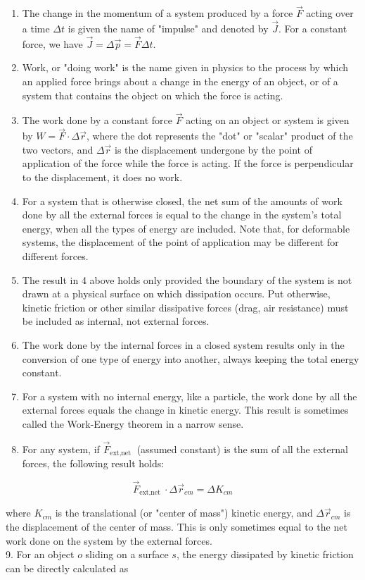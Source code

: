 \documentclass[10pt]{article}
\begin{document}
\begin{enumerate}
  \item The change in the momentum of a system produced by a force $\vec{F}$ acting over a time $\Delta t$ is given the name of "impulse" and denoted by $\vec{J}$. For a constant force, we have $\vec{J}=\Delta \vec{p}=\vec{F} \Delta t$.
  \item Work, or "doing work" is the name given in physics to the process by which an applied force brings about a change in the energy of an object, or of a system that contains the object on which the force is acting.
  \item The work done by a constant force $\vec{F}$ acting on an object or system is given by $W=\vec{F} \cdot \Delta \vec{r}$, where the dot represents the "dot" or "scalar" product of the two vectors, and $\Delta \vec{r}$ is the displacement undergone by the point of application of the force while the force is acting. If the force is perpendicular to the displacement, it does no work.
  \item For a system that is otherwise closed, the net sum of the amounts of work done by all the external forces is equal to the change in the system's total energy, when all the types of energy are included. Note that, for deformable systems, the displacement of the point of application may be different for different forces.
  \item The result in 4 above holds only provided the boundary of the system is not drawn at a physical surface on which dissipation occurs. Put otherwise, kinetic friction or other similar dissipative forces (drag, air resistance) must be included as internal, not external forces.
  \item The work done by the internal forces in a closed system results only in the conversion of one type of energy into another, always keeping the total energy constant.
  \item For a system with no internal energy, like a particle, the work done by all the external forces equals the change in kinetic energy. This result is sometimes called the Work-Energy theorem in a narrow sense.
  \item For any system, if $\vec{F}_{\text {ext,net }}$ (assumed constant) is the sum of all the external forces, the following result holds:
\end{enumerate}

$$
\vec{F}_{\text {ext,net }} \cdot \Delta \vec{r}_{c m}=\Delta K_{c m}
$$

where $K_{c m}$ is the translational (or "center of mass") kinetic energy, and $\Delta \vec{r}_{c m}$ is the displacement of the center of mass. This is only sometimes equal to the net work done on the system by the external forces.\\
9. For an object $o$ sliding on a surface $s$, the energy dissipated by kinetic friction can be directly calculated as
\end{document}
